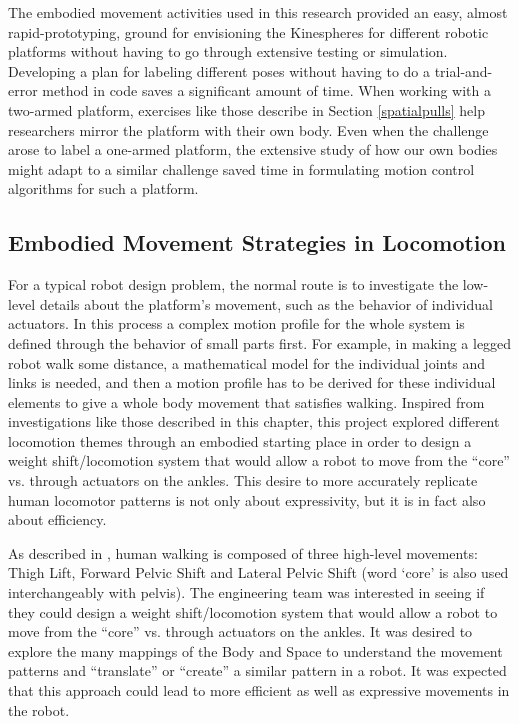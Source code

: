 \documentclass[arts,article,submit,moreauthors,pdftex,10pt,a4paper]{mdpi}
\begin{document}
The embodied movement activities used in this research provided an easy, almost rapid-prototyping, ground for envisioning the Kinespheres for different robotic platforms without having to go through extensive testing or simulation. Developing a plan for labeling different poses without having to do a trial-and-error method in code saves a significant amount of time.  When working with a two-armed platform, exercises like those describe in Section \ref{spatialpulls} help researchers mirror the platform with their own body. Even when the challenge arose to label a one-armed platform, the extensive study of how our own bodies might adapt to a similar challenge saved time in formulating motion control algorithms for such a platform.
 


\subsection{Embodied Movement Strategies in Locomotion}

For a typical robot design problem, the normal route is to investigate the low-level details about the platform's movement, such as the behavior of individual actuators.  In this process a complex motion profile for the whole system is defined through the behavior of small parts first. For example, in making a legged robot walk some distance, a mathematical model for the individual joints and links is needed, and then a motion profile has to be derived for these individual elements to give a whole body movement that satisfies walking.  Inspired from investigations like those described in this chapter, this project explored different locomotion themes through an embodied starting place in order to design a weight shift/locomotion system that would allow a robot to move from the ``core'' vs. through actuators on the ankles. %
This desire to more accurately replicate human locomotor patterns is not only about expressivity, but it is in fact also about efficiency. 

As described in \cite{irmgard}, human walking is composed of three high-level movements: Thigh Lift, Forward Pelvic Shift and Lateral Pelvic Shift (word ‘core’ is also used interchangeably with pelvis). The engineering team was interested in seeing if they could design a weight shift/locomotion system that would allow a robot to move from the ``core'' vs. through actuators on the ankles. It was desired to explore the many mappings of the Body and Space to understand the movement patterns and ``translate'' or ``create'' a similar pattern in a robot. It was expected that this approach could lead to more efficient as well as expressive movements in the robot.
\end{document}

